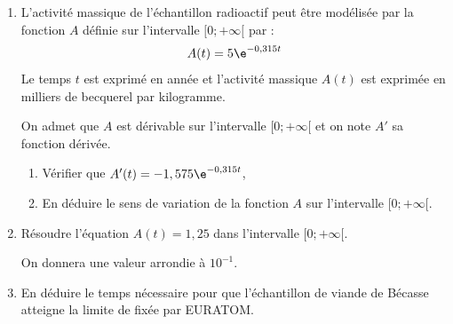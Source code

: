 \begin{enumerate}[start=9]
	\item L'activité massique de l'échantillon radioactif peut être
	modélisée par la fonction $A$ définie sur l'intervalle $[0 ; +\infty[$ par :
	\[A(t) =5 \e^{-0,315t}\]
	Le temps $t$ est exprimé en année et l'activité massique $A(t)$ est exprimée en
	milliers de becquerel par kilogramme.

	On admet que $A$ est dérivable sur l'intervalle $[0 ; +\infty[ $ et on note $A'$ sa fonction
	dérivée.
	\begin{enumerate}
		\item  Vérifier que $A'(t) = -1,575 \e ^{-0,315t}$,
		\item  En déduire le sens de variation de la fonction $A$ sur l'intervalle $[0 ; +\infty[$.
	\end{enumerate}
	\item Résoudre l'équation $A(t) = 1,25$ dans l'intervalle $[0 ; +\infty[$.

	On donnera une valeur arrondie à $10^{-1}$.

	\item En déduire le temps nécessaire pour que l'échantillon de viande de Bécasse atteigne la limite de  fixée par EURATOM.
\end{enumerate}

